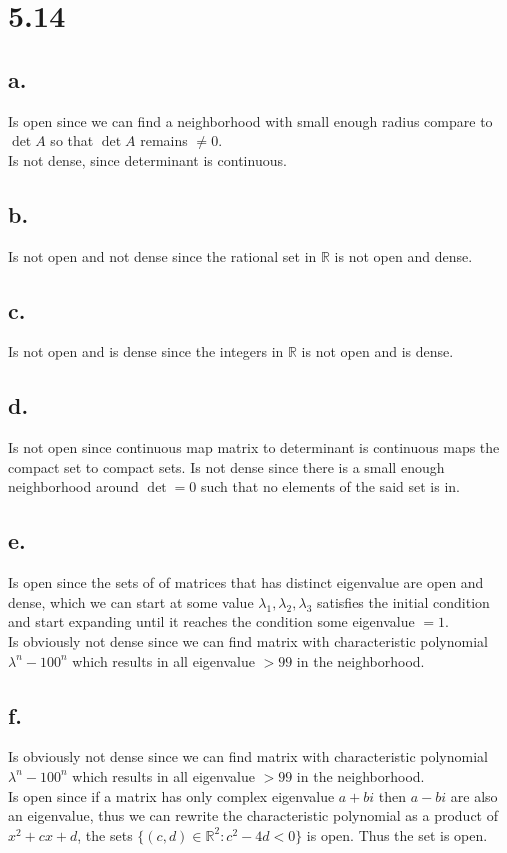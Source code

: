 \documentclass[11pt]{article}
\theoremstyle{mystyle}
\theoremstyle{definition}
\begin{document}
\section*{5.14}
\subsection*{a.}
Is open since we can find a neighborhood with small enough radius compare to $\det A$ so that $\det A$ remains $\ne 0$. \\
Is not dense, since determinant is continuous. 
\subsection*{b.}
Is not open and not dense since the rational set in $\mathbb{R}$ is not open and dense. 
\subsection*{c.}
Is not open and is dense since the integers in $\mathbb{R}$ is not open and is dense. 
\subsection*{d.}
Is not open since continuous map matrix to determinant is continuous maps the compact set to compact sets. Is not dense since there is a small enough neighborhood around $\det = 0$ such that no elements of the said set is in.  
\subsection*{e.}
Is open since the sets of of matrices that has distinct eigenvalue are open and dense, which we can start at some value $\lambda_1, \lambda_2, \lambda_3$ satisfies the initial condition and start expanding until it reaches the condition some eigenvalue $= 1$. \\
Is obviously not dense since we can find matrix with characteristic polynomial $\lambda^n - 100^n$ which results in all eigenvalue $> 99$ in the neighborhood. 
\subsection*{f.}
Is obviously not dense since we can find matrix with characteristic polynomial $\lambda^n - 100^n$ which results in all eigenvalue $> 99$ in the neighborhood. \\
Is open since if a matrix has only complex eigenvalue $a + bi$ then $a - bi$ are also an eigenvalue, thus we can rewrite the characteristic polynomial as a product of $x^2 + cx + d$, the sets $\{(c,d) \in \mathbb{R}^2: c^2 - 4d < 0\}$ is open. Thus the set is open.  
\end{document}
